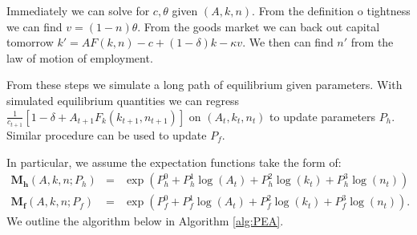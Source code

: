 \documentclass[12pt]{article}
\begin{document}
Immediately we can solve for $c,\theta$ given $(A,k,n)$. From the definition o tightness we can find $v=(1-n)\theta$. From the goods market we can back out capital tomorrow $k'=AF(k,n)-c+(1-\delta)k-\kappa v$. We then can find $n'$ from the law of motion of employment. \par

From these steps we simulate a long path of equilibrium given parameters. With simulated equilibrium quantities we can regress $\frac{1}{c_{t+1}} \left[  1-\delta + A_{t+1}F_{k}(k_{t+1},n_{t+1}) \right]$ on $(A_{t},k_{t},n_{t})$ to update parameters $P_{h}$. Similar procedure can be used to update $P_{f}$. \par

In particular, we assume the expectation functions take the form of:
\begin{eqnarray}
	\mathbf{M_{h}}(A,k,n;P_{h})	&=& \exp( P_{h}^0 + P_{h}^1 \log(A_t) + P_{h}^2 \log(k_t) + P_{h}^3 \log(n_t)) \\
	\mathbf{M_{f}}(A,k,n;P_{f})	&=& \exp( P_{f}^0 + P_{f}^1 \log(A_t) + P_{f}^2 \log(k_t) + P_{f}^3 \log(n_t)).
\end{eqnarray}
We outline the algorithm below in Algorithm \ref{alg:PEA}.
\end{document}

